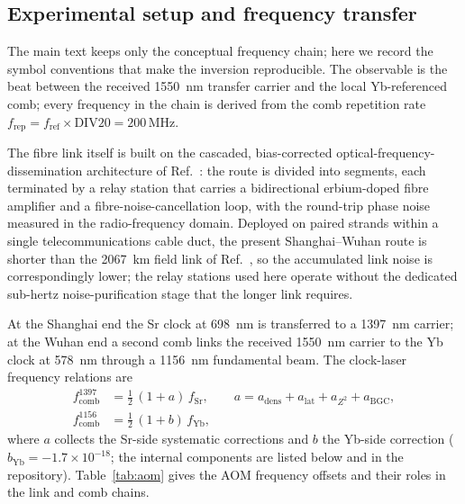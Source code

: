 \documentclass[11pt,a4paper]{article}
\newcommand{\e}[1]{\times 10^{#1}}
\begin{document}
\subsection{Experimental setup and frequency transfer}

The main text keeps only the conceptual frequency chain; here we record
the symbol conventions that make the inversion reproducible. The
observable is the beat between the received \qty{1550}{nm} transfer carrier
and the local Yb-referenced comb; every frequency in the chain is derived
from the comb repetition rate $f_{\mathrm{rep}} =
f_{\mathrm{ref}}\times\mathrm{DIV20} = 200$\,MHz.

The fibre link itself is built on the cascaded,
bias-corrected optical-frequency-dissemination architecture of
Ref.~\citep{chen2026dissemination}: the route is divided into segments,
each terminated by a relay station that carries a bidirectional
erbium-doped fibre amplifier and a fibre-noise-cancellation loop, with the
round-trip phase noise measured in the radio-frequency domain. Deployed
on paired strands within a single telecommunications cable duct, the
present Shanghai--Wuhan route is shorter than the \qty{2067}{km} field link of
Ref.~\citep{chen2026dissemination}, so the accumulated link noise is
correspondingly lower; the relay stations used here operate without the
dedicated sub-hertz noise-purification stage that the longer link
requires.

At the Shanghai end the Sr clock at \qty{698}{nm} is transferred to a
\qty{1397}{nm} carrier; at the Wuhan end a second comb links the received
\qty{1550}{nm} carrier to the Yb clock at \qty{578}{nm} through a \qty{1156}{nm}
fundamental beam. The clock-laser frequency relations are
\begin{align}
  f_{\mathrm{comb}}^{1397} &= \tfrac{1}{2}\,(1+a)\,f_{\mathrm{Sr}},
  \qquad a = a_{\mathrm{dens}} + a_{\mathrm{lat}} + a_{Z^2} + a_{\mathrm{BGC}}, \\
  f_{\mathrm{comb}}^{1156} &= \tfrac{1}{2}\,(1+b)\,f_{\mathrm{Yb}},
\end{align}
where $a$ collects the Sr-side systematic corrections \citep{jia2026sr} and
$b$ the Yb-side correction \citep{zhu2026yb} ($b_{\mathrm{Yb}} =
-1.7\e{-18}$; the internal components are listed below and in the
repository). Table~\ref{tab:aom} gives the AOM frequency offsets and
their roles in the link and comb chains.
\end{document}
